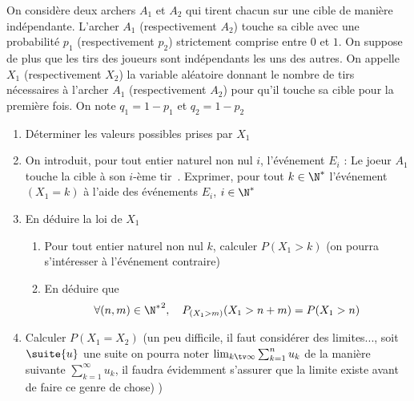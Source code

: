 \begin{exercice}
On considère deux archers $A_1$ et $A_2$ qui tirent chacun sur une cible de manière indépendante. 
L’archer $A_1$ (respectivement $A_2$) touche sa cible avec une probabilité $p_1$ (respectivement 
$p_2$) strictement comprise entre $0$ et $1$. On suppose de plus que les tirs des joueurs sont 
indépendants les uns des autres. On appelle $X_1$ (respectivement $X_2$) la variable aléatoire donnant 
le nombre de tirs nécessaires à l’archer $A_1$ (respectivement $A_2$) pour qu’il touche sa cible pour la 
première fois. On note $q_1=1-p_1$ et $q_2=1 -p_2$
\begin{enumerate}
\item Déterminer les valeurs possibles prises par $X_1$

\item On introduit, pour tout entier naturel non nul $i$, l'événement $E_i$ : \og Le joeur $A_1$ touche la cible à son $i$-ème tir\fg\, . 
Exprimer, pour tout $k\in \N^*$ l'événement $(X_1=k)$ à l'aide des événements $E_i$, $i\in \N^*$
\item En déduire la loi de $X_1$
\begin{enumerate}
\item Pour tout entier naturel non nul $k$, calculer $P(X_1>k)$ (on pourra s'intéresser à l'événement contraire) 
\item En déduire que 
$$\forall (n,m) \in {\N^*}^2, \quad P_{(X_1>m)} (X_1>n+m) = P(X_1>n)$$
\end{enumerate}
\item Calculer $P(X_1=X_2)$ (un peu difficile, il faut considérer des limites..., soit $\suite{u}$ une suite on pourra noter 
$\lim_{k\tv \infty} \sum_{k=1}^n u_k $ de la manière suivante $\sum_{k=1}^\infty u_k$, il faudra évidemment s'assurer que la limite existe avant de faire ce genre de chose) 
) 
\end{enumerate}
\end{exercice}
